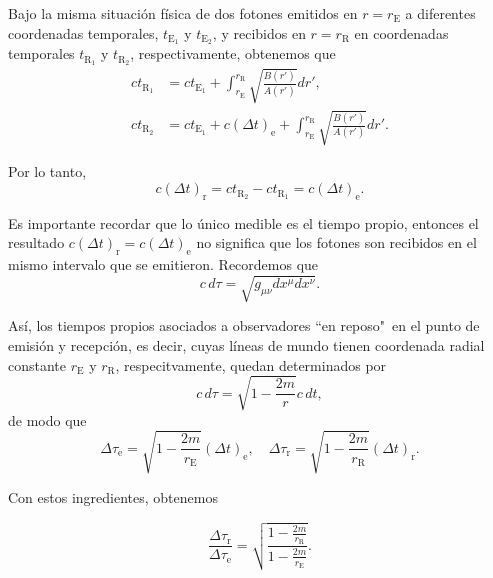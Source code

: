 \documentclass[letterpaper,11pt]{article}
\begin{document}
Bajo la misma situación física de dos fotones emitidos en $r = r_{\text{E}}$ a diferentes coordenadas temporales, $t_{\text{E}_1}$ y $t_{\text{E}_2}$, y recibidos en $r = r_{\text{R}}$ en coordenadas temporales $t_{\text{R}_1}$ y $t_{\text{R}_2}$, respectivamente, obtenemos que
\begin{align}
ct_{\text{R}_1} &=  ct_{\text{E}_1} + \int_{r_{\text{E}}}^{r_{\text{R}}} \sqrt{\frac{B(r')}{A(r')}} dr', \label{eq:trayectory-light-7} \\
ct_{\text{R}_2} &=  ct_{\text{E}_1} + c(\Delta t)_{\text{e}} +\int_{r_{\text{E}}}^{r_{\text{R}}} \sqrt{\frac{B(r')}{A(r')}} dr'. \label{eq:trayectory-light-8}
\end{align}

Por lo tanto,
\begin{equation}
c(\Delta t)_{\text{r}} = ct_{\text{R}_2} - ct_{\text{R}_1} = c(\Delta t)_{\text{e}}. 
\end{equation}

Es importante recordar que lo único medible es el tiempo propio, entonces el resultado $c(\Delta t)_{\text{r}}  = c(\Delta t)_{\text{e}}$ no significa que los fotones son recibidos en el mismo intervalo que se emitieron. Recordemos que 
\begin{equation}
c\,d\tau = \sqrt{g_{\mu\nu} dx^{\mu}dx^{\nu}}.
\end{equation}

Así, los tiempos propios asociados a observadores ``en reposo"\ en el punto de emisión y recepción, es decir, cuyas líneas de mundo tienen coordenada radial constante $r_{\text{E}}$ y $r_{\text{R}}$, respecitvamente, quedan determinados por 
\begin{equation}
c\, d\tau = \sqrt{1 - \frac{2m}{r}} c\,dt,
\end{equation}
de modo que
\begin{equation}
\Delta \tau_{\text{e}} = \sqrt{1 - \frac{2m}{r_{\text{E}}}} (\Delta t)_{\text{e}}, \quad \Delta \tau_{\text{r}} = \sqrt{1 - \frac{2m}{r_{\text{R}}}} (\Delta t)_{\text{r}}.
\end{equation}

Con estos ingredientes, obtenemos
\begin{shaded}
\begin{equation}
\frac{\Delta \tau_\text{r}}{\Delta \tau_{\text{e}}} = \sqrt{\frac{1 - \frac{2m}{r_{\text{R}}}}{1 - \frac{2m}{r_{\text{E}}}}}. \label{eq:redshift-grav}
\end{equation}
\end{shaded}
\end{document}
